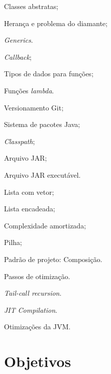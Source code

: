 \documentclass{article}
\begin{document}
\begin{samepage}
\begin{itemize*}[label={}]
    \item[] Classes abstratas;
    \item[] Herança e problema do diamante;
    \item[] \textit{Generics}.
    \item[] \textit{Callback};
    \item[] Tipos de dados para funções;
    \item[] Funções \textit{lambda}.
    \item[] Versionamento Git;
    \item[] Sistema de pacotes Java;
    \item[] \textit{Classpath};
    \item[] Arquivo JAR\@;
    \item[] Arquivo JAR executável.
    \item[] Lista com vetor;
    \item[] Lista encadeada;
    \item[] Complexidade amortizada;
    \item[] Pilha;
    \item[] Padrão de projeto: Composição.
    \item[] Passos de otimização.
    \item[] \textit{Tail-call recursion}.
    \item[] \textit{JIT Compilation}.
    \item[] Otimizações da JVM\@.
\end{itemize*}
\end{samepage}

\section{Objetivos}
\end{document}
